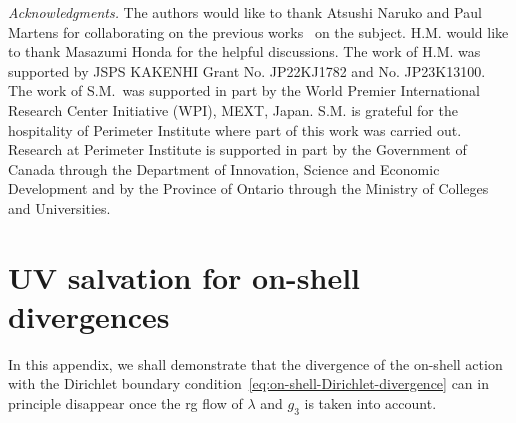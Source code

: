 \documentclass[superscriptaddress,aps,preprintnumbers,nofootinbib]{revtex4-2}
\begin{document}
\medskip
{\it Acknowledgments.}
The authors would like to thank Atsushi Naruko and Paul Martens for collaborating on the previous works~\cite{Matsui:2021yte,Martens:2022dtd,Matsui:2022lfj} on the subject. H.M. would like to thank Masazumi Honda for the helpful discussions. The work of H.M. was supported by JSPS KAKENHI Grant No. JP22KJ1782 and No. JP23K13100. The work of S.M.~was supported in part by the World Premier International Research Center Initiative (WPI), MEXT, Japan. S.M. is grateful for the hospitality of Perimeter Institute where part of this work was carried out. Research at Perimeter Institute is supported in part by the Government of Canada through the Department of Innovation, Science and Economic Development and by the Province of Ontario through the Ministry of Colleges and Universities. 




\appendix

\section{UV salvation for on-shell divergences}
\label{sec:appendix1}

In this appendix, we shall demonstrate that the divergence of the on-shell action with the Dirichlet boundary condition~\eqref{eq:on-shell-Dirichlet-divergence} can in principle disappear once the \ac{rg} flow of $\lambda$ and $g_{3}$ is taken into account. 
\end{document}
